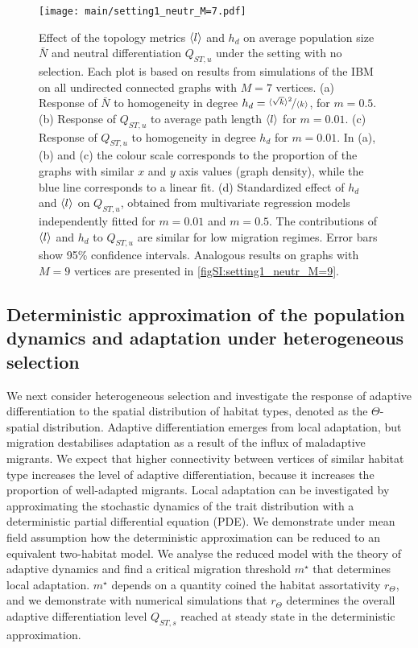   \begin{figure}[ht]
	  \centering
		\texttt{[image: main/setting1\_neutr\_M=7.pdf]}
		\caption{\small 
		Effect of the topology metrics $\langle l \rangle$ and $h_d$ on average population size $\bar{N}$ and neutral differentiation $Q_{ST,u}$ under the setting with no selection. Each plot is based on results from  simulations of the IBM on all undirected connected graphs with $M=7$ vertices.
		(a) Response of $\bar{N}$ to homogeneity in degree $h_d = \nicefrac{\langle \sqrt{k} \rangle^2}{\langle k \rangle}$, for $m=0.5$.
		(b) Response of $Q_{ST,u}$ to average path length $\langle l \rangle$ for $m=0.01$.
		(c) Response of $Q_{ST,u}$ to homogeneity in degree $h_d$ for $m=0.01$.
		In (a), (b) and (c) the colour scale corresponds to the proportion of the graphs with similar $x$ and $y$ axis values (graph density), while the blue line corresponds to a linear fit. 
		(d) Standardized effect of $h_d$ and $\langle l \rangle$ on $Q_{ST,u}$, obtained from multivariate regression models independently fitted for $m = 0.01$ and $m=0.5$.
		The contributions of $\langle l \rangle$ and $h_d$ to $Q_{ST,u}$ are similar for low migration regimes. Error bars show 95\% confidence intervals.
		Analogous results on graphs with $M=9$ vertices are presented in \cref{figSI:setting1_neutr_M=9}.
		 }
		\label{fig:setting1_neutr_M=7}
  \end{figure}
  
  
  \clearpage
  
  \subsection{Deterministic approximation of the population dynamics and adaptation under heterogeneous selection}\label{sec:result2a}
  
  We next consider heterogeneous selection and investigate the response of adaptive differentiation to the spatial distribution of habitat types, denoted as the $\Theta$-spatial distribution. 
  Adaptive differentiation emerges from local adaptation, but migration destabilises adaptation as a result of the influx of maladaptive migrants. We expect that higher connectivity between vertices of similar habitat type increases the level of adaptive differentiation, because it increases the proportion of well-adapted migrants. Local adaptation can be investigated by approximating the stochastic dynamics of the trait distribution with a deterministic partial differential equation (PDE). We demonstrate under mean field assumption how the deterministic approximation can be reduced to an equivalent two-habitat model. We analyse the reduced model with the theory of adaptive dynamics \cite{Meszena1997,Mirrahimi2020} and find a critical migration threshold $m^\star$ that determines local adaptation. $m^\star$ depends on a quantity coined the habitat assortativity $r_\Theta$, and we demonstrate with numerical simulations that $r_\Theta$ determines the overall adaptive differentiation level $Q_{ST,s}$ reached at steady state in the deterministic approximation.
  
